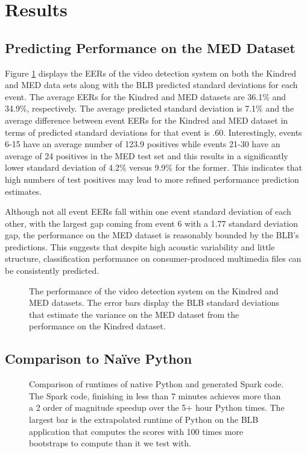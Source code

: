 
\section{Results}

\subsection{Predicting Performance on the MED Dataset}

Figure \ref{fig:blb} displays the EERs of the video detection system on both the Kindred and MED data sets along with the BLB predicted standard deviations for each event. 
The average EERs for the Kindred and MED datasets are 36.1\% and 34.9\%, respectively. 
The average predicted standard deviation is 7.1\% and the average difference between event EERs for the Kindred and MED dataset in terms of predicted standard deviations for that event is .60. 
Interestingly, events 6-15 have an average number of 123.9 positives while events 21-30 have an average of 24 positives in the MED test set and this results in a significantly lower standard deviation of 4.2\% versus 9.9\% for the former. 
This indicates that high numbers of test positives may lead to more refined performance prediction estimates.  

Although not all event EERs fall within one event standard deviation of each other, with the largest gap coming from event 6 with a 1.77 standard deviation gap, the performance on the MED dataset is reasonably bounded by the BLB's predictions. 
This suggests that despite high acoustic variability and little structure, classification performance on consumer-produced multimedia files can be consistently predicted. 

\begin{figure}[ht]
\centering
{}
\caption{The performance of the video detection system on the Kindred and MED datasets. 
 The error bars display the BLB standard deviations that estimate the variance on the MED dataset from the performance on the Kindred dataset.}
\label{fig:blb}
\end{figure}


\subsection{Comparison to Na\"ive Python}
\begin{figure}
\centering
{}
\caption{Comparison of runtimes of native Python and generated Spark code. The Spark code, finishing in less than 7 minutes achieves more than a 2 order of magnitude speedup over the 5+ hour Python times. The largest bar is the extrapolated runtime of Python on the BLB application that computes the scores with 100 times more bootstraps to compute than it we test with.}
\label{fig:python}
\end{figure}
 
